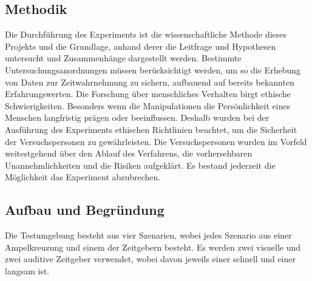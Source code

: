 \documentclass{Paper}
\begin{document}
        \subsection{Methodik}
        Die Durchführung des Experiments ist die wissenschaftliche Methode dieses Projekts und die Grundlage, anhand derer die Leitfrage und Hypothesen  untersucht und Zusammenhänge dargestellt werden.
Bestimmte Untersuchungsanordnungen müssen berücksichtigt werden, um so die Erhebung von Daten zur Zeitwahrnehmung zu sichern, aufbauend auf bereits bekannten Erfahrungswerten. 
Die Forschung über menschliches Verhalten birgt ethische Schwierigkeiten. Besonders wenn die Manipulationen die Persönlichkeit eines Menschen langfristig prägen oder beeinflussen. Deshalb wurden bei der Ausführung des Experiments ethischen Richtlinien beachtet, um die Sicherheit der Versuchspersonen zu gewährleisten. 
Die Versuchspersonen wurden im Vorfeld weitestgehend über den Ablauf des Verfahrens, die vorhersehbaren Unannehmlichkeiten und die Risiken aufgeklärt. Es bestand jederzeit die Möglichkeit das Experiment abzubrechen.


\subsection{Aufbau und Begründung}

Die Testumgebung besteht aus vier Szenarien, wobei jedes Szenario aus einer Ampelkreuzung und einem der Zeitgebern besteht. Es werden zwei visuelle und zwei auditive Zeitgeber verwendet, wobei davon jeweils einer schnell und einer langsam ist.
\end{document}
